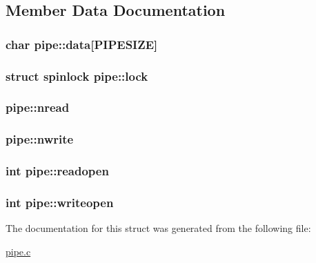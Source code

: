 \subsection{Member Data Documentation}
\subsubsection[{\texorpdfstring{data}{data}}]{\setlength{\rightskip}{0pt plus 5cm}char pipe\+::data\mbox{[}{\bf P\+I\+P\+E\+S\+I\+ZE}\mbox{]}}\hypertarget{structpipe_ab02ae9fa0b8b092512c28c7c080f0c7b}{}\label{structpipe_ab02ae9fa0b8b092512c28c7c080f0c7b}
\subsubsection[{\texorpdfstring{lock}{lock}}]{\setlength{\rightskip}{0pt plus 5cm}struct {\bf spinlock} pipe\+::lock}\hypertarget{structpipe_a0ce399a2ba316d11cb8e678069bfd5b4}{}\label{structpipe_a0ce399a2ba316d11cb8e678069bfd5b4}
\subsubsection[{\texorpdfstring{nread}{nread}}]{ pipe\+::nread}\hypertarget{structpipe_ad71eb56c445f9178dac07ae47f352fd1}{}\label{structpipe_ad71eb56c445f9178dac07ae47f352fd1}
\subsubsection[{\texorpdfstring{nwrite}{nwrite}}]{ pipe\+::nwrite}\hypertarget{structpipe_a419b6fc2780013358de51c91371dac66}{}\label{structpipe_a419b6fc2780013358de51c91371dac66}
\subsubsection[{\texorpdfstring{readopen}{readopen}}]{\setlength{\rightskip}{0pt plus 5cm}int pipe\+::readopen}\hypertarget{structpipe_a7bdc57b39ef97dda61e468ad9e8dbfba}{}\label{structpipe_a7bdc57b39ef97dda61e468ad9e8dbfba}
\subsubsection[{\texorpdfstring{writeopen}{writeopen}}]{\setlength{\rightskip}{0pt plus 5cm}int pipe\+::writeopen}\hypertarget{structpipe_a9538da698ddd63615c991a318094663b}{}\label{structpipe_a9538da698ddd63615c991a318094663b}


The documentation for this struct was generated from the following file\+:\begin{DoxyCompactItemize}
\item 
\hyperlink{pipe_8c}{pipe.\+c}\end{DoxyCompactItemize}
